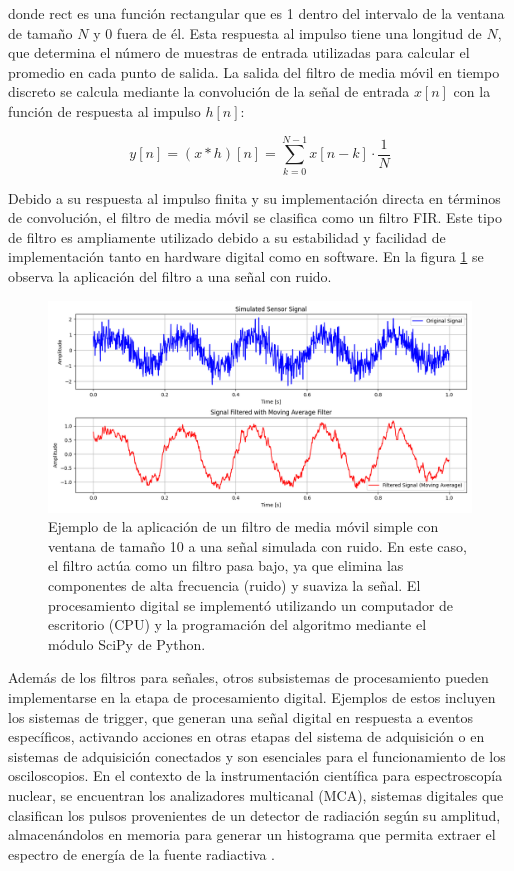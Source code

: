 \documentclass[]{book}
\begin{document}
\noindent donde \( \text{rect} \) es una función rectangular que es 1 dentro del intervalo de la ventana de tamaño \( N \) y 0 fuera de él. Esta respuesta al impulso tiene una longitud de \( N \), que determina el número de muestras de entrada utilizadas para calcular el promedio en cada punto de salida. La salida del filtro de media móvil en tiempo discreto se calcula mediante la convolución de la señal de entrada \( x[n] \) con la función de respuesta al impulso \( h[n] \):

\begin{equation}
    y[n] = (x * h)[n] = \sum_{k=0}^{N-1} x[n-k] \cdot \frac{1}{N}
\end{equation}

\noindent Debido a su respuesta al impulso finita y su implementación directa en términos de convolución, el filtro de media móvil se clasifica como un filtro FIR. Este tipo de filtro es ampliamente utilizado debido a su estabilidad y facilidad de implementación tanto en hardware digital como en software. En la figura \ref{fig:SMA}
se observa la aplicación del filtro a una señal con ruido.
\begin{figure}[h]
    \centering
    \includegraphics[width=1.0\textwidth]{SMA.png}
    \caption{Ejemplo de la aplicación de un filtro de media móvil simple con ventana de tamaño 10 a una señal simulada con ruido. En este caso, el filtro actúa como un filtro pasa bajo, ya que elimina las componentes de alta frecuencia (ruido) y suaviza la señal. El procesamiento digital se implementó utilizando un computador de escritorio (CPU) y la programación del algoritmo mediante el módulo SciPy de Python.}
    \label{fig:SMA}

\end{figure}

\noindent Además de los filtros para señales, otros subsistemas de procesamiento pueden implementarse en la etapa de procesamiento digital. Ejemplos de estos incluyen los sistemas de trigger, que generan una señal digital en respuesta a eventos específicos, activando acciones en otras etapas del sistema de adquisición o en sistemas de adquisición conectados y son esenciales para el funcionamiento de los osciloscopios. En el contexto de la instrumentación científica para espectroscopía nuclear, se encuentran los analizadores multicanal (MCA), sistemas digitales que clasifican los pulsos provenientes de un detector de radiación según su amplitud, almacenándolos en memoria para generar un histograma que permita extraer el espectro de energía de la fuente radiactiva \cite{knoll2010radiation}.
\end{document}
